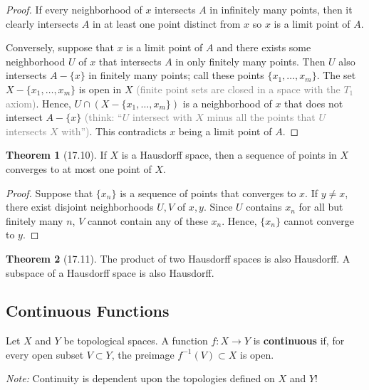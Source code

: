 \documentclass{article}
\newcommand{\nline}{\vspace*{0.5\baselineskip}}
\newcommand{\com}[1]{\textcolor{grey}{#1}}
\theoremstyle{definition}
\newtheorem{theorem}{Theorem}[subsection]
\begin{document}
\begin{flushleft}
\begin{proof}
If every neighborhood of $x$ intersects $A$ in infinitely many points, then it clearly intersects $A$ in at least one point distinct from $x$ so $x$ is a limit point of $A$.

\nline

Conversely, suppose that $x$ is a limit point of $A$ and there exists some neighborhood $U$ of $x$ that intersects $A$ in only finitely many points. Then $U$ also intersects $A - \{x\}$ in finitely many points; call these points $\{x_1,\dots,x_m\}$. The set $X - \{x_1,\dots,x_m\}$ is open in $X$ \com{(finite point sets are closed in a space with the $T_1$ axiom)}. Hence, $U \cap (X - \{x_1,\dots,x_m\})$ is a neighborhood of $x$ that does not intersect $A - \{x\}$ \com{(think: ``$U$ intersect with $X$ minus all the points that $U$ intersects $X$ with'')}. This contradicts $x$ being a limit point of $A$.
\end{proof}

\begin{theorem}[17.10]
If $X$ is a Hausdorff space, then a sequence of points in $X$ converges to at most one point of $X$.
\end{theorem}

\begin{proof}
Suppose that $\{x_n\}$ is a sequence of points that converges to $x$. If $y \neq x$, there exist disjoint neighborhoods $U, V$ of $x, y$. Since $U$ contains $x_n$ for all but finitely many $n$, $V$ cannot contain any of these $x_n$. Hence, $\{x_n\}$ cannot converge to $y$.
\end{proof}

\begin{theorem}[17.11]
The product of two Hausdorff spaces is also Hausdorff. A subspace of a Hausdorff space is also Hausdorff.
\end{theorem}

\subsection{Continuous Functions}

Let $X$ and $Y$ be topological spaces. A function $f: X \to Y$ is \textbf{continuous} if, for every open subset $V \subset Y$, the preimage $f^{-1}(V) \subset X$ is open.

\nline

\textit{Note:} Continuity is dependent upon the topologies defined on $X$ and $Y$!

\nline


\end{flushleft}
\end{document}
